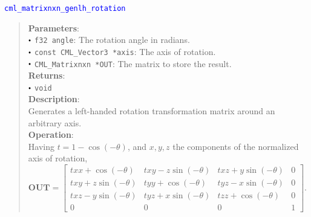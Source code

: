 \documentclass[a4paper,oneside,8pt]{extarticle}
\newcommand{\function}[1]{
  \noindent\textcolor{blue}{\texttt{#1}}
  \vspace{-0.3em}
}
\renewcommand{\dot}{\raisebox{0.3ex}{\scalebox{0.6}{$\bullet$}}}
\theoremstyle{definition}
\begin{document}
\function{cml\_matrixnxn\_genlh\_rotation}
\begin{quote}
  \textbf{Parameters}: \\
  $\dot$ \texttt{f32 angle}: The rotation angle in radians. \\
  $\dot$ \texttt{const CML\_Vector3 *axis}: The axis of rotation. \\
  $\dot$ \texttt{CML\_Matrixnxn *OUT}: The matrix to store the result. \\
  \textbf{Returns}: \\
  $\dot$ \texttt{void} \\

  \vspace{-0.75em}
  \textbf{Description}: \\
  Generates a left-handed rotation transformation matrix around an arbitrary axis. \\

  \vspace{-0.75em}
  \textbf{Operation}: \\
  Having $t = 1 - \cos(-\theta)$, and $x,y,z$ the components of the normalized axis of rotation, $\mathbf{OUT} = \begin{bmatrix}
  txx + \cos(-\theta) & txy - z\sin(-\theta) & txz + y\sin(-\theta) & 0 \\
  txy + z\sin(-\theta) & tyy + \cos(-\theta) & tyz - x\sin(-\theta) & 0 \\
  txz - y\sin(-\theta) & tyz + x\sin(-\theta) & tzz + \cos(-\theta) & 0 \\
  0 & 0 & 0 & 1
  \end{bmatrix}$. \\
\end{quote}
\end{document}
